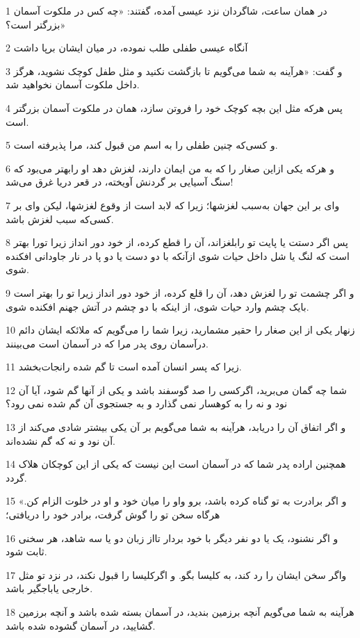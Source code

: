\par 1 در همان ساعت، شاگردان نزد عیسی آمده، گفتند: «چه کس در ملکوت آسمان بزرگتر است؟»
\par 2 آنگاه عیسی طفلی طلب نموده، در میان ایشان برپا داشت
\par 3 و گفت: «هرآینه به شما می‌گویم تا بازگشت نکنید و مثل طفل کوچک نشوید، هرگز داخل ملکوت آسمان نخواهید شد.
\par 4 پس هر‌که مثل این بچه کوچک خود را فروتن سازد، همان در ملکوت آسمان بزرگتر است.
\par 5 و کسی‌که چنین طفلی را به اسم من قبول کند، مرا پذیرفته است.
\par 6 و هر‌که یکی ازاین صغار را که به من ایمان دارند، لغزش دهد او رابهتر می‌بود که سنگ آسیایی بر گردنش آویخته، در قعر دریا غرق می‌شد!
\par 7 وای بر این جهان به‌سبب لغزشها؛ زیرا که لابد است از وقوع لغزشها، لیکن وای بر کسی‌که سبب لغزش باشد.
\par 8 پس اگر دستت یا پایت تو رابلغزاند، آن را قطع کرده، از خود دور انداز زیرا تورا بهتر است که لنگ یا شل داخل حیات شوی ازآنکه با دو دست یا دو پا در نار جاودانی افکنده شوی.
\par 9 و اگر چشمت تو را لغزش دهد، آن را قلع کرده، از خود دور انداز زیرا تو را بهتر است بایک چشم وارد حیات شوی، از اینکه با دو چشم در آتش جهنم افکنده شوی.
\par 10 زنهار یکی از این صغار را حقیر مشمارید، زیرا شما را می‌گویم که ملائکه ایشان دائم درآسمان روی پدر مرا که در آسمان است می‌بینند.
\par 11 زیرا که پسر انسان آمده است تا گم شده رانجات‌بخشد.
\par 12 شما چه گمان می‌برید، اگرکسی را صد گوسفند باشد و یکی از آنها گم شود، آیا آن نود و نه را به کوهسار نمی گذارد و به جستجوی آن گم شده نمی رود؟
\par 13 و اگر اتفاق آن را دریابد، هرآینه به شما می‌گویم بر آن یکی بیشتر شادی می‌کند از آن نود و نه که گم نشده‌اند.
\par 14 همچنین اراده پدر شما که در آسمان است این نیست که یکی از این کوچکان هلاک گردد.
\par 15 «و اگر برادرت به تو گناه کرده باشد، برو واو را میان خود و او در خلوت الزام کن. هرگاه سخن تو را گوش گرفت، برادر خود را دریافتی؛
\par 16 و اگر نشنود، یک یا دو نفر دیگر با خود بردار تااز زبان دو یا سه شاهد، هر سخنی ثابت شود.
\par 17 واگر سخن ایشان را رد کند، به کلیسا بگو. و اگرکلیسا را قبول نکند، در نزد تو مثل خارجی یاباجگیر باشد.
\par 18 هرآینه به شما می‌گویم آنچه برزمین بندید، در آسمان بسته شده باشد و آنچه برزمین گشایید، در آسمان گشوده شده باشد.
